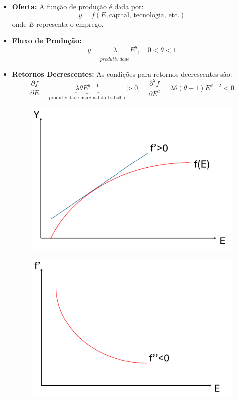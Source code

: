 \documentclass[a4paper,12pt]{article}[abntex2]
\begin{document}
\begin{itemize}
    \item \textbf{Oferta:} A função de produção é dada por:
    \[
    y = f(E, \text{capital, tecnologia, etc.})
    \]
    onde $E$ representa o emprego.

    \item \textbf{Fluxo de Produção:}
    \[
    y = \underbrace{\lambda}_{produtividade} E^{\theta}, \quad 0 < \theta < 1
    \]

    \item \textbf{Retornos Decrescentes:} As condições para retornos decrescentes são:
    \[
    \frac{\partial f}{\partial E}=\underbrace{\lambda\theta E^{\theta-1}}_{\text{produtividade marginal do trabalho}} > 0, \quad \frac{\partial^2 f}{\partial E^2}=\lambda\theta(\theta -1) E^{\theta-2} < 0
    \]
    \begin{figure}[H]
        \centering
        \includegraphics[width=0.7\linewidth]{Imagens/a5i2.png}
    \end{figure}

    \begin{figure}[H]
        \centering
        \includegraphics[width=0.7\linewidth]{Imagens/a5i3.png}
    \end{figure}
    
\end{itemize}
\end{document}
